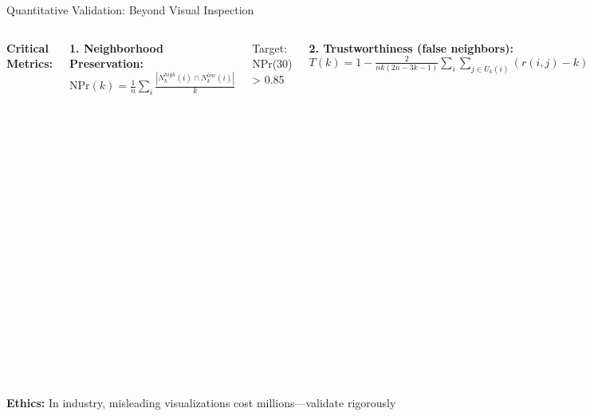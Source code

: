 \documentclass[aspectratio=169]{beamer}
\newcommand{\ethics}[1]{\colorbox{purple!10}{\textcolor{ethicscolor}{\textbf{Ethics:} #1}}}
\begin{document}
\begin{frame}{Quantitative Validation: Beyond Visual Inspection}
\begin{columns}
\textbf{Critical Metrics:}

\textbf{1. Neighborhood Preservation:}
$\text{NPr}(k) = \frac{1}{n}\sum_i \frac{|N_k^{high}(i) \cap N_k^{low}(i)|}{k}$

Target: NPr(30) > 0.85

\textbf{2. Trustworthiness (false neighbors):}
$T(k) = 1 - \frac{2}{nk(2n-3k-1)}\sum_i \sum_{j \in U_k(i)} (r(i,j) - k)$

Target: T(30) > 0.90

\textbf{3. Stability (10 runs):}
$\rho = \text{mean pairwise correlation}$

Target: $\rho$ > 0.85


\vspace{0.2cm}
\textbf{Validation Protocol:}
\begin{enumerate}
\item Run 10 times (different seeds)
\item Compute all three metrics
\item Sweep perplexity [5, 10, 20, 30, 50]
\item Report mean ± std
\item Show correlation matrix
\end{enumerate}
\end{columns}

\vspace{0.3cm}
\ethics{In industry, misleading visualizations cost millions—validate rigorously}
\end{frame}
\end{document}

